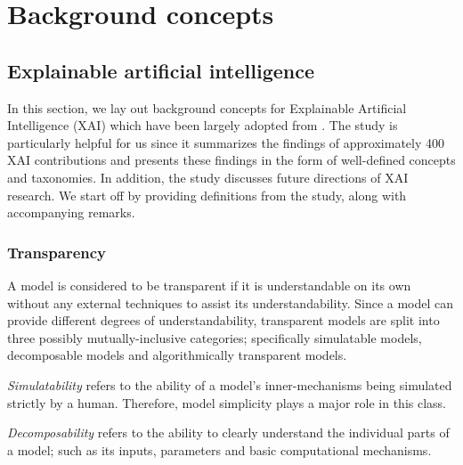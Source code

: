\chapter{Background concepts}

\label{chapter:background}

\section{Explainable artificial intelligence}

\label{section:xai}

In this section, we lay out background concepts for Explainable Artificial Intelligence (XAI) which have been largely adopted from \citet{arrieta2020explainable}. The study is particularly helpful for us since it summarizes the findings of approximately 400 XAI contributions and presents these findings in the form of well-defined concepts and taxonomies. In addition, the study discusses future directions of XAI research. We start off by providing definitions from the study, along with accompanying remarks.

\subsection{Transparency}

\begin{definition}
  A model is considered to be transparent if it is understandable on its own without any external techniques to assist its understandability. Since a model can provide different degrees of understandability, transparent models are split into three possibly mutually-inclusive categories; specifically simulatable models, decomposable models and algorithmically transparent models. 
\end{definition}

\begin{remark}
  \textit{Simulatability} refers to the ability of a model's inner-mechanisms being simulated strictly by a human. Therefore, model simplicity plays a major role in this class.
\end{remark}

\begin{remark}
  \textit{Decomposability} refers to the ability to clearly understand the individual parts of a model; such as its inputs, parameters and basic computational mechanisms.
\end{remark}

